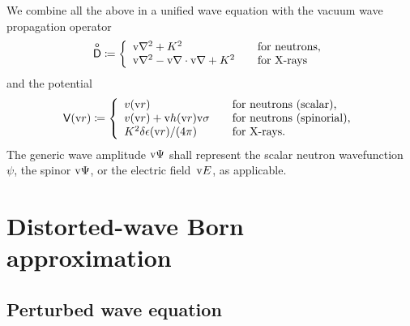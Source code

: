 We combine all the above in a unified wave equation
%
with the vacuum wave propagation operator
%
%
\begin{equation}
  \mathsf{\overset{o}{D}} \coloneqq \left\{ \begin{array}{ll}
      \text{v}{\nabla}^2 + K^2                     &\text{~~~for neutrons,}\\
      \text{v}{\nabla}^2 - \text{v}{\nabla}\cdot\text{v}{\nabla} + K^2 &\text{~~~for X-rays}
  \end{array}\right.
\end{equation}
%
and the potential
%
%
\begin{equation}
  \mathsf{V}(\text{v}{r}) \coloneqq \left\{ \begin{array}{ll}
      v(\text{v}{r})                         &\text{~~~for neutrons (scalar),}\\
      v(\text{v}{r})+\text{v}{h}(\text{v}{r})\text{v}\sigma       &\text{~~~for neutrons (spinorial),}\\
      K^2\delta \epsilon(\text{v}{r})/(4\pi) &\text{~~~for X-rays.}
  \end{array}\right.
\end{equation}
The generic wave amplitude $\text{v}{\Psi}$
%
shall represent
the scalar neutron wavefunction~$\psi$,
the spinor $\text{v}{\Psi}$, or the electric field~$\text{v}{E}$, as applicable.

\section{Distorted-wave Born approximation}\label{SDWBA}

\subsection{Perturbed wave equation}\label{Sfluct}


